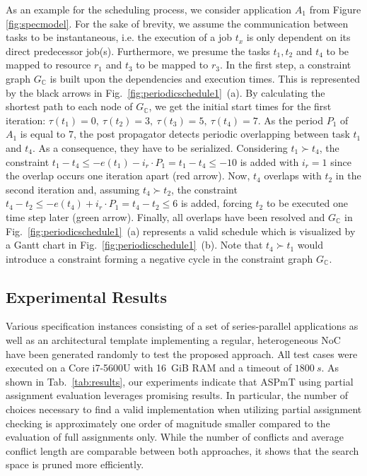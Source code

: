 As an example for the scheduling process, we consider application $A_1$ from Figure \ref{fig:specmodel}. 
For the sake of brevity, we assume the communication between tasks to be instantaneous, i.e. the execution of a job $t_x$ is only dependent on its direct predecessor job(s). Furthermore, we presume the tasks $t_1, t_2$ and $t_4$ to be mapped to resource $r_1$ and $t_3$ to be mapped to $r_3$. 
In the first step, a constraint graph $G_\mathbb{C}$ is built upon the dependencies and execution times. %
This is represented by the black arrows in Fig.~\ref{fig:periodicschedule1}~(a). 
By calculating the shortest path to each node of $G_\mathbb{C}$, we get the initial start times for the first iteration: $\tau(t_1)=0,\ \tau(t_2)=3,\ \tau(t_3)=5,\ \tau(t_4)=7$. 
As the period $P_1$ of $A_1$ is equal to $7$, the post propagator detects periodic overlapping between task $t_1$ and $t_4$. 
As a consequence, they have to be serialized. Considering $t_1\succ t_4$, the constraint \mbox{$t_1-t_4\leq -e(t_1)-i_r\cdot P_1=t_1-t_4\leq -10$} is added with $i_r=1$ since the overlap occurs one iteration apart (red arrow). 
Now, $t_4$ overlaps with $t_2$ in the second iteration and, assuming $t_4\succ t_2$, the constraint $t_4-t_2\leq -e(t_4)+i_r\cdot P_1=t_4-t_2\leq 6$ is added, forcing $t_2$ to be executed one time step later (green arrow). 
Finally, all overlaps have been resolved and $G_\mathbb{C}$ in Fig.~\ref{fig:periodicschedule1}~(a) represents a valid schedule which is visualized by a Gantt chart in Fig.~\ref{fig:periodicschedule1}~(b). 
Note that $t_4\succ t_1$ would introduce a constraint forming a negative cycle in the constraint graph $G_\mathbb{C}$.

\subsection{Experimental Results}
Various specification instances consisting of a set of series-parallel applications as well as an architectural template implementing a regular, heterogeneous NoC have been generated randomly to test the proposed approach. All test cases were executed on a Core i7-5600U with 16~GiB RAM and a timeout of $1800\ s$. As shown in Tab.~\ref{tab:results}, our experiments indicate that ASPmT using partial assignment evaluation leverages promising results. In particular, the number of choices necessary to find a valid implementation when utilizing partial assignment checking is approximately one order of magnitude smaller compared to the evaluation of full assignments only. While the number of conflicts and average conflict length are comparable between both approaches, it shows that the search space is pruned more efficiently.

